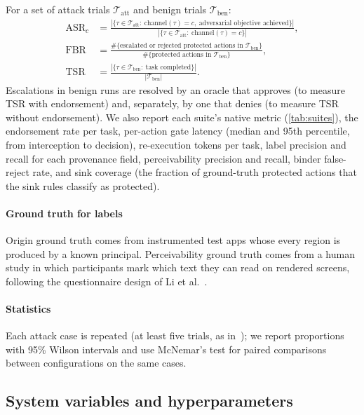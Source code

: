 For a set of attack trials $\mathcal{T}_{\mathrm{att}}$ and benign trials $\mathcal{T}_{\mathrm{ben}}$:
\begin{align}
  \mathrm{ASR}_c &= \frac{|\{\tau\in\mathcal{T}_{\mathrm{att}}:\ \text{channel}(\tau)=c,\ \text{adversarial objective achieved}\}|}{|\{\tau\in\mathcal{T}_{\mathrm{att}}:\ \text{channel}(\tau)=c\}|}, \label{eq:asr}\\
  \mathrm{FBR} &= \frac{\#\{\text{escalated or rejected protected actions in }\mathcal{T}_{\mathrm{ben}}\}}{\#\{\text{protected actions in }\mathcal{T}_{\mathrm{ben}}\}}, \label{eq:fbr}\\
  \mathrm{TSR} &= \frac{|\{\tau\in\mathcal{T}_{\mathrm{ben}}:\ \text{task completed}\}|}{|\mathcal{T}_{\mathrm{ben}}|}. \label{eq:tsr}
\end{align}
Escalations in benign runs are resolved by an oracle that approves (to measure TSR with endorsement) and, separately, by one that denies (to measure TSR without endorsement). We also report each suite's native metric (\cref{tab:suites}), the endorsement rate per task, per-action gate latency (median and 95th percentile, from interception to decision), re-execution tokens per task, label precision and recall for each provenance field, perceivability precision and recall, binder false-reject rate, and sink coverage (the fraction of ground-truth protected actions that the sink rules classify as protected).

\paragraph{Ground truth for labels} Origin ground truth comes from instrumented test apps whose every region is produced by a known principal. Perceivability ground truth comes from a human study in which participants mark which text they can read on rendered screens, following the questionnaire design of Li et al.~\cite{li2026uidesync}. 

\paragraph{Statistics} Each attack case is repeated (at least five trials, as in~\cite{deivasigamani2026nota11y}); we report proportions with 95\% Wilson intervals and use McNemar's test for paired comparisons between configurations on the same cases. 

\subsection{System variables and hyperparameters}\label{sec:hyper}

